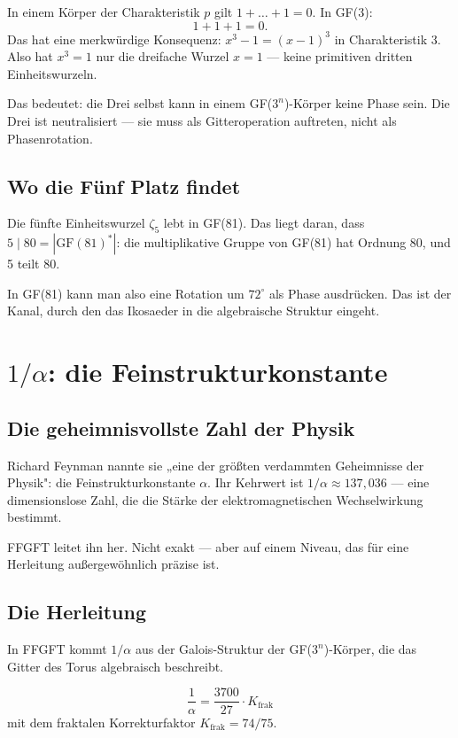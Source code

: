\documentclass[12pt,oneside]{book}
\begin{document}
In einem Körper der Charakteristik $p$ gilt $1 + \dots + 1 = 0$. In GF(3):
\[
1 + 1 + 1 = 0.
\]
Das hat eine merkwürdige Konsequenz: $x^3 - 1 = (x - 1)^3$ in Charakteristik 3. Also hat $x^3 = 1$ nur die dreifache Wurzel $x = 1$ — keine primitiven dritten Einheitswurzeln.

Das bedeutet: die Drei selbst kann in einem GF($3^n$)-Körper keine Phase sein. Die Drei ist neutralisiert — sie muss als Gitteroperation auftreten, nicht als Phasenrotation.

\section{Wo die Fünf Platz findet}

Die fünfte Einheitswurzel $\zeta_5$ lebt in GF(81). Das liegt daran, dass $5 \mid 80 = |\text{GF}(81)^*|$: die multiplikative Gruppe von GF(81) hat Ordnung 80, und 5 teilt 80.

In GF(81) kann man also eine Rotation um $72^\circ$ als Phase ausdrücken. Das ist der Kanal, durch den das Ikosaeder in die algebraische Struktur eingeht.

\chapter{$1/\alpha$: die Fein\-struktur\-konstante}

\section{Die geheimnisvollste Zahl der Physik}

Richard Feynman nannte sie „eine der größten verdammten Geheimnisse der Physik": die Fein\-struktur\-konstante $\alpha$. Ihr Kehrwert ist $1/\alpha \approx 137{,}036$ — eine dimensionslose Zahl, die die Stärke der elektromagnetischen Wechselwirkung bestimmt.

FFGFT leitet ihn her. Nicht exakt — aber auf einem Niveau, das für eine Herleitung außergewöhnlich präzise ist.

\section{Die Herleitung}

In FFGFT kommt $1/\alpha$ aus der Galois-Struktur der GF($3^n$)-Körper, die das Gitter des Torus algebraisch beschreibt.

\begin{merkbox}
\[
\frac{1}{\alpha} = \frac{3700}{27} \cdot K_{\text{frak}}
\]
mit dem fraktalen Korrekturfaktor $K_{\text{frak}} = 74/75$.
\end{merkbox}
\end{document}
